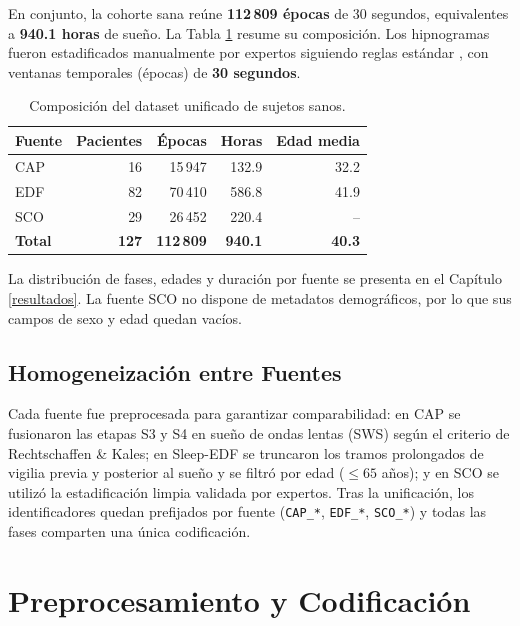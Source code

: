 En conjunto, la cohorte sana reúne \textbf{112\,809 épocas} de 30 segundos, equivalentes a \textbf{940.1 horas} de sueño. La Tabla \ref{tab:dataset_unificado} resume su composición. Los hipnogramas fueron estadificados manualmente por expertos siguiendo reglas estándar \citep{rechtschaffen1968manual}, con ventanas temporales (épocas) de \textbf{30 segundos}.

\begin{table}[htbp]
\centering
\caption{Composición del dataset unificado de sujetos sanos.}
\label{tab:dataset_unificado}
\begin{tabular}{lrrrr}
\hline
\textbf{Fuente} & \textbf{Pacientes} & \textbf{Épocas} & \textbf{Horas} & \textbf{Edad media} \\
\hline
CAP   & 16  & 15\,947  & 132.9 & 32.2 \\
EDF   & 82  & 70\,410  & 586.8 & 41.9 \\
SCO   & 29  & 26\,452  & 220.4 & --   \\
\hline
\textbf{Total} & \textbf{127} & \textbf{112\,809} & \textbf{940.1} & \textbf{40.3} \\
\hline
\end{tabular}
\end{table}

La distribución de fases, edades y duración por fuente se presenta en el Capítulo \ref{resultados}. La fuente SCO no dispone de metadatos demográficos, por lo que sus campos de sexo y edad quedan vacíos.

\subsection{Homogeneización entre Fuentes}

Cada fuente fue preprocesada para garantizar comparabilidad: en CAP se fusionaron las etapas S3 y S4 en sueño de ondas lentas (SWS) según el criterio de Rechtschaffen \& Kales; en Sleep-EDF se truncaron los tramos prolongados de vigilia previa y posterior al sueño y se filtró por edad ($\leq 65$ años); y en SCO se utilizó la estadificación limpia validada por expertos. Tras la unificación, los identificadores quedan prefijados por fuente (\texttt{CAP\_*}, \texttt{EDF\_*}, \texttt{SCO\_*}) y todas las fases comparten una única codificación.

\section{Preprocesamiento y Codificación}

